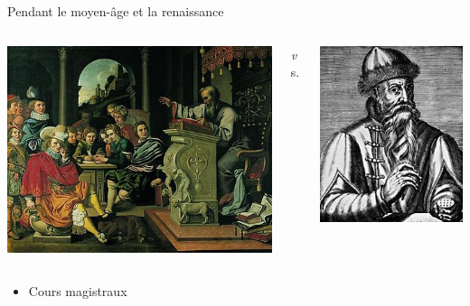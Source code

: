 \begin{frame}{Pendant le moyen-âge et la renaissance}
\begin{columns}
	\begin{column}{0.40\linewidth}
		\centering
		\includegraphics[height=0.35\paperheight]{../resources/illustrations/lecture} \\
	\end{column}
	\begin{column}{0.09\linewidth} \centering \huge \emph vs. \end{column}
	\begin{column}{0.40\linewidth}
		\centering
		\includegraphics[height=0.35\paperheight]{../resources/illustrations/gutenberg} \\
	\end{column}
\end{columns}
\begin{columns}
	\begin{column}{0.49\linewidth}
		\begin{itemize}
			\item Cours magistraux

\end{itemize}
\end{column}
\end{columns}
\end{frame}
